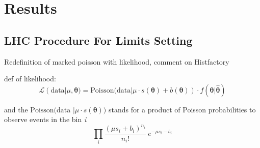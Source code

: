 
\section{Results}

\subsection{LHC Procedure For Limits Setting}
\label{sec:limits}
Redefinition of marked poisson  with likelihood, comment on Histfactory

def of likelihood:
$$
\mathcal{L}(\text{data}|\mu, \boldsymbol{\theta}) = \text{Poisson(data} | \mu \cdot s(\boldsymbol{\theta}) + b(\boldsymbol{\theta})) 
	\cdot f(\boldsymbol{\theta} | \hat{\boldsymbol{\theta}})
$$

and the $\text{Poisson(data }| \mu \cdot s(\boldsymbol{\theta})) $
stands for a product of Poisson probabilities to observe  events in the bin \textit{i}
$$
\prod_{i} \frac{(\mu s_i +b_i)^{n_i}}{n_i!} ~ e^{-\mu s_i -b_i}
$$

